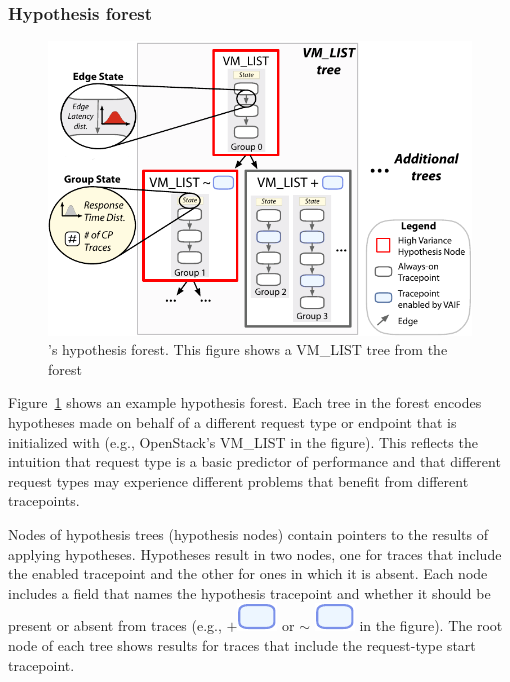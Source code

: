 \subsubsection{Hypothesis forest}

{
\begin{figure}[tb]
  \centering
 
  \includegraphics[width=\columnwidth]{figures/hypo.pdf}
 
  \caption{\STAIF{}'s hypothesis forest. This figure shows a \textsc{VM\_LIST} tree from the forest}
  \label{fig:hyp_tree}
   
\end{figure}
}

Figure~\ref{fig:hyp_tree} shows an example hypothesis forest.  Each
tree in the forest encodes hypotheses made on behalf of a different
request type or endpoint that \STAIF{} is initialized with (e.g.,
OpenStack's \textsc{VM\_LIST} in the figure).  This reflects the
intuition that request type is a basic predictor of performance and
that different request types may experience different problems
that benefit from different tracepoints.



Nodes of hypothesis trees (hypothesis nodes) contain pointers to the
results of applying hypotheses. Hypotheses result in two
nodes, one for traces that include the enabled tracepoint and the other
for ones in which it is absent.  Each node includes a field that
names the hypothesis tracepoint and whether it should be present or
absent from traces (e.g., $+$\includegraphics[scale=0.7, trim=-0 0.1cm 0 0]{figures/blue_bubble.pdf} or $\sim$ \includegraphics[scale=0.7, trim=-0 0.1cm 0 0]{figures/blue_bubble.pdf} in the
figure).  The root node of each tree shows results for traces that
include the request-type start tracepoint.

